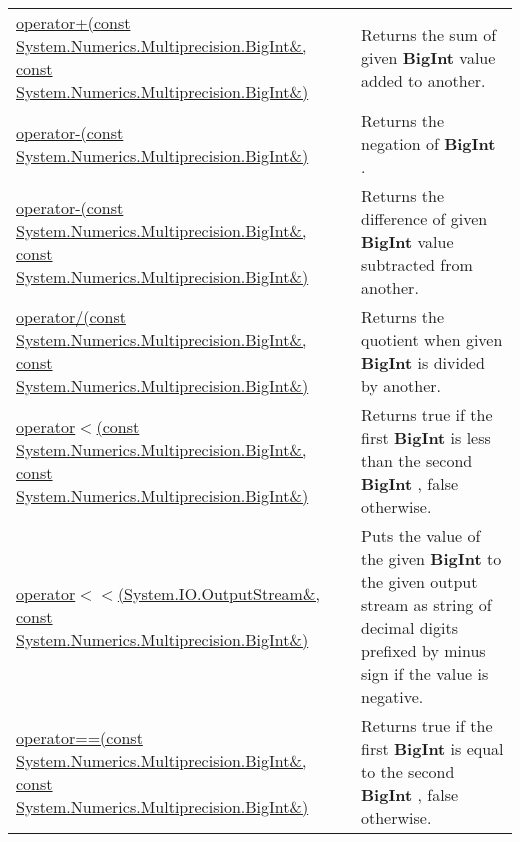 \documentclass[a4paper,oneside,11.000000pt]{book}
\begin{document}
\begin{flushleft}
\begin{supertabular}[l]{!{\raggedright}p{7.575cm}!{\raggedright}p{7.575cm}}
\\
\hyperlink{System.Numerics.Multiprecision.operator.plus.C.R.System.Numerics.Multiprecision.BigInt.C.R.System.Numerics.Multiprecision.BigInt}{operator+(const System.\-Numerics.\-Multiprecision.\-BigInt\&\-, const System.\-Numerics.\-Multiprecision.\-BigInt\&\-)}
& Returns the sum of given \textbf{BigInt}
 value added to another.

\\
\hyperlink{System.Numerics.Multiprecision.operator.minus.C.R.System.Numerics.Multiprecision.BigInt}{operator-(const System.\-Numerics.\-Multiprecision.\-BigInt\&\-)}
& Returns the negation of \textbf{BigInt}
.

\\
\hyperlink{System.Numerics.Multiprecision.operator.minus.C.R.System.Numerics.Multiprecision.BigInt.C.R.System.Numerics.Multiprecision.BigInt}{operator-(const System.\-Numerics.\-Multiprecision.\-BigInt\&\-, const System.\-Numerics.\-Multiprecision.\-BigInt\&\-)}
& Returns the difference of given \textbf{BigInt}
 value subtracted from another.

\\
\hyperlink{System.Numerics.Multiprecision.operator.divides.C.R.System.Numerics.Multiprecision.BigInt.C.R.System.Numerics.Multiprecision.BigInt}{operator/(const System.\-Numerics.\-Multiprecision.\-BigInt\&\-, const System.\-Numerics.\-Multiprecision.\-BigInt\&\-)}
& Returns the quotient when given \textbf{BigInt}
 is divided by another.

\\
\hyperlink{System.Numerics.Multiprecision.operator.less.C.R.System.Numerics.Multiprecision.BigInt.C.R.System.Numerics.Multiprecision.BigInt}{operator$<$\-(const System.\-Numerics.\-Multiprecision.\-BigInt\&\-, const System.\-Numerics.\-Multiprecision.\-BigInt\&\-)}
& Returns true if the first \textbf{BigInt}
 is less than the second \textbf{BigInt}
, false otherwise.

\\
\hyperlink{System.Numerics.Multiprecision.operator.shiftLeft.R.System.IO.OutputStream.C.R.System.Numerics.Multiprecision.BigInt}{operator$<$\-$<$\-(System.\-IO.\-OutputStream\&\-, const System.\-Numerics.\-Multiprecision.\-BigInt\&\-)}
& Puts the value of the given \textbf{BigInt}
 to the given output stream as string of decimal digits prefixed by minus sign if the value is negative.

\\
\hyperlink{System.Numerics.Multiprecision.operator.equal.C.R.System.Numerics.Multiprecision.BigInt.C.R.System.Numerics.Multiprecision.BigInt}{operator==(const System.\-Numerics.\-Multiprecision.\-BigInt\&\-, const System.\-Numerics.\-Multiprecision.\-BigInt\&\-)}
& Returns true if the first \textbf{BigInt}
 is equal to the second \textbf{BigInt}
, false otherwise.


\end{supertabular}
\end{flushleft}
\end{document}

